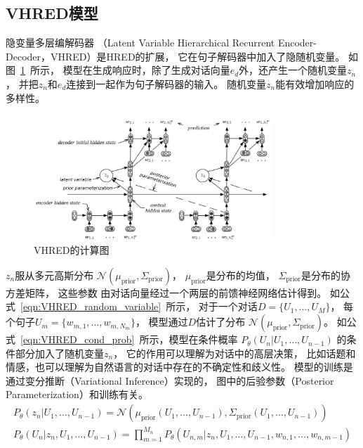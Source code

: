 \subsection{VHRED模型}\label{subsec:VHRED}
隐变量多层编解码器
（Latent Variable Hierarchical Recurrent Encoder-Decoder，VHRED）是HRED的扩展，
它在句子解码器中加入了隐随机变量。
如图~\ref{fig:VHRED}~所示，
模型在生成响应时，除了生成对话向量$e_d$外，还产生一个随机变量$z_n$，
并把$z_n$和$e_d$连接到一起作为句子解码器的输入。
随机变量$z_n$能有效增加响应的多样性。
\begin{figure}[H]
    \centering
    \includegraphics[width=0.8\textwidth]{figure/VHRED.png}
    \caption{VHRED的计算图}
    \label{fig:VHRED}
\end{figure}

$z_n$服从多元高斯分布
$\mathcal{N}(\mu_{\text{prior}}, \Sigma_{\text{prior}})$，
$\mu_{\text{prior}}$是分布的均值，
$\Sigma_{\text{prior}}$是分布的协方差矩阵，
这些参数
由对话向量经过一个两层的前馈神经网络估计得到。
如公式~\ref{eqn:VHRED_random_variable}~所示，
对于一个对话$D = \{ U_1, \dots, U_M \}$，
每个句子$U_m = \{ w_{m, 1}, \dots, w_{m, N_m} \}$，
模型通过$D$估计了分布
$\mathcal{N}(\mu_{\text{prior}}, \Sigma_{\text{prior}})$。
如公式~\ref{eqn:VHRED_cond_prob}~所示，模型在条件概率
$P_{\theta}(U_n|U_1, \dots, U_{n-1})$
的条件部分加入了随机变量$z_n$，
它的作用可以理解为对话中的高层决策，
比如话题和情感，也可以理解为自然语言的对话中存在的不确定性和歧义性。
模型的训练是通过变分推断（Variational Inference）实现的，
图中的后验参数（Posterior Parameterization）和训练有关。
\begin{align}
    P_{\theta}(z_n|{U}_1, \dots, U_{n-1}) = \mathcal{N}(\mu_{\text{prior}}(U_1, \dots, U_{n-1}), \Sigma_{\text{prior}}(U_1, \dots, U_{n-1}))
    \label{eqn:VHRED_random_variable} \\
    P_{\theta}(U_n|z_n, U_1, \dots, U_{n-1}) = \prod_{m=1}^{M_n}P_{\theta}(U_{n, m}|z_n, U_1, \dots, U_{n-1}, w_{n, 1}, \dots, w_{n, m-1})
    \label{eqn:VHRED_cond_prob}
\end{align}



